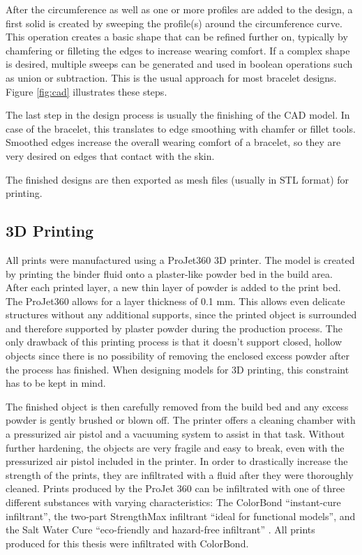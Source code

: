 After the circumference as well as one or more profiles are added to the design, a first solid is created by sweeping the profile(s) around the circumference curve. This operation creates a basic shape that can be refined further on, typically by chamfering or filleting the edges to increase wearing comfort. If a complex shape is desired, multiple sweeps can be generated and used in boolean operations such as union or subtraction. This is the usual approach for most bracelet designs. Figure \ref{fig:cad} illustrates these steps.

The last step in the design process is usually the finishing of the \ac{CAD} model. In case of the bracelet, this translates to edge smoothing with chamfer or fillet tools. Smoothed edges increase the overall wearing comfort of a bracelet, so they are very desired on edges that contact with the skin.

The finished designs are then exported as mesh files (usually in \ac{STL} format) for printing.

\subsection{3D Printing}
All prints were manufactured using a ProJet360 3D printer\cite{printer}. The model is created by printing the binder fluid onto a plaster-like powder bed in the build area. After each printed layer, a new thin layer of powder is added to the print bed. The ProJet360 allows for a layer thickness of 0.1 mm\cite{datasheet_printer}. This allows even delicate structures without any additional supports, since the printed object is surrounded and therefore supported by plaster powder during the production process. The only drawback of this printing process is that it doesn't support closed, hollow objects since there is no possibility of removing the enclosed excess powder after the process has finished. When designing models for 3D printing, this constraint has to be kept in mind.

The finished object is then carefully removed from the build bed and any excess powder is gently brushed or blown off. The printer offers a cleaning chamber with a pressurized air pistol and a vacuuming system to assist in that task. Without further hardening, the objects are very fragile and easy to break, even with the pressurized air pistol included in the printer. In order to drastically increase the strength of the prints, they are infiltrated with a fluid after they were thoroughly cleaned. Prints produced by the ProJet 360 can be infiltrated with one of three different substances with varying characteristics: The ColorBond ``instant-cure infiltrant'', the two-part StrengthMax infiltrant ``ideal for functional models'', and the Salt Water Cure ``eco-friendly and hazard-free infiltrant'' \cite{datasheet_printer}. All prints produced for this thesis were infiltrated with ColorBond.

